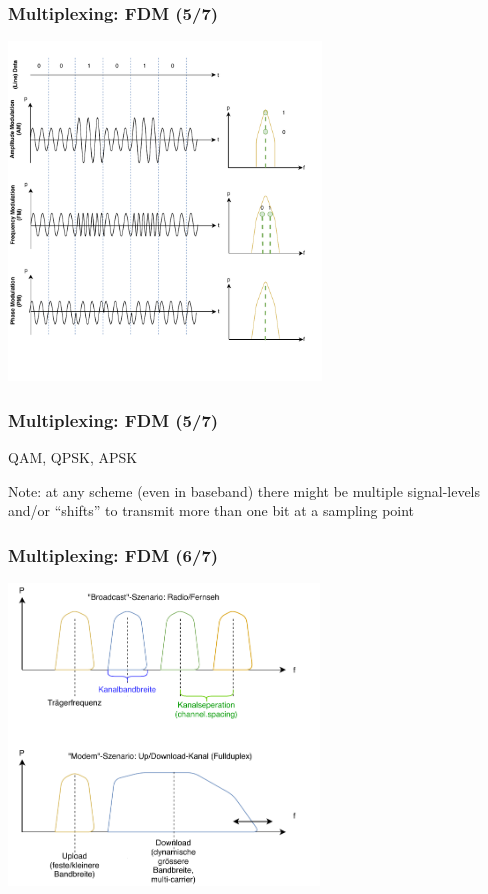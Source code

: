 \documentclass[ignorenonframetext]{beamer}
\begin{document}
\begin{frame}
\frametitle{Multiplexing: FDM (5/7)}
\includegraphics[height=9cm]{modulation-schemes}
\end{frame}





\begin{frame}
\frametitle{Multiplexing: FDM (5/7)}
QAM, QPSK, APSK

Note: at any scheme (even in baseband) there might be multiple signal-levels and/or ``shifts'' to transmit more than one bit at a sampling point
\end{frame}







\begin{frame}
\frametitle{Multiplexing: FDM (6/7)}
\includegraphics[height=8cm]{fm-spectra}
\end{frame}
\end{document}
